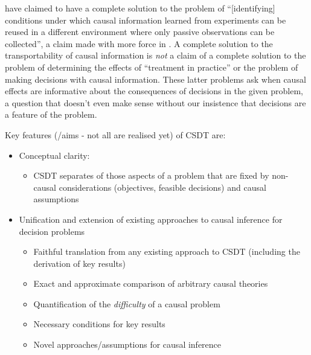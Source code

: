 \citet{bareinboim_transportability_2012} have claimed to have a complete solution to the problem of ``[identifying] conditions under which causal information learned from experiments can be reused in a different environment where only passive observations can be collected'', a claim made with more force in \citet{pearl_challenging_2018}. A complete solution to the transportability of causal information is \emph{not} a claim of a complete solution to the problem of determining the effects of ``treatment in practice'' or the problem of making decisions with causal information. These latter problems ask when causal effects are informative about the consequences of decisions in the given problem, a question that doesn't even make sense without our insistence that decisions are a feature of the problem.

Key features (/aims - not all are realised yet) of CSDT are:

\begin{itemize}
	\item Conceptual clarity:
	\begin{itemize}
		\item CSDT separates of those aspects of a problem that are fixed by non-causal considerations (objectives, feasible decisions) and causal assumptions
	\end{itemize}
	\item Unification and extension of existing approaches to causal inference for decision problems
	\begin{itemize}
		\item Faithful translation from any existing approach to CSDT (including the derivation of key results)
		\item Exact and approximate comparison of arbitrary causal theories
		\item Quantification of the \emph{difficulty} of a causal problem
		\item Necessary conditions for key results
		\item Novel approaches/assumptions for causal inference
	\end{itemize}	
\end{itemize}




